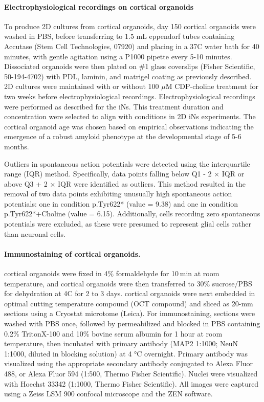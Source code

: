 \paragraph{Electrophysiological recordings on cortical organoids}
To produce 2D cultures from cortical organoids, day 150 cortical organoids were washed in PBS, before transferring to 1.5 mL eppendorf tubes containing Accutase (Stem Cell Technologies, 07920) and placing in a 37C water bath for 40 minutes, with gentle agitation using a P1000 pipette every 5-10 minutes. Dissociated organoids were then plated on \#1 glass coverslips (Fisher Scientific, 50-194-4702) with PDL, laminin, and matrigel coating as previously described. 2D cultures were maintained with or without 100 $\mu$M CDP-choline treatment for two weeks before electrophysiological recordings. Electrophysiological recordings were performed as described for the iNs. This treatment duration and concentration were selected to align with conditions in 2D iNs experiments. The cortical organoid age was chosen based on empirical observations indicating the emergence of a robust amyloid phenotype at the developmental stage of 5-6 months.

Outliers in spontaneous action potentials were detected using the interquartile range (IQR) method. Specifically, data points falling below Q1 - 2 × IQR or above Q3 + 2 × IQR were identified as outliers. This method resulted in the removal of two data points exhibiting unusually high spontaneous action potentials: one in condition p.Tyr622* (value = 9.38) and one in condition p.Tyr622*+Choline (value = 6.15). Additionally, cells recording zero spontaneous potentials were excluded, as these were presumed to represent glial cells rather than neuronal cells.

\paragraph{Immunostaining of cortical organoids.}
cortical organoids were fixed in 4\% formaldehyde for 10 min at room temperature, and cortical organoids were then transferred to 30\% sucrose/PBS for dehydration at 4C for 2 to 3 days. cortical organoids were next embedded in optimal cutting temperature compound (OCT compound) and sliced as 20-mm sections using a Cryostat microtome (Leica). For immunostaining, sections were washed with PBS once, followed by permeabilized and blocked in PBS containing 0.2\% TritonX-100 and 10\% bovine serum albumin for 1 hour at room temperature, then incubated with primary antibody (MAP2 1:1000; NeuN 1:1000, diluted in blocking solution) at 4 °C overnight. Primary antibody was visualized using the appropriate secondary antibody conjugated to Alexa Fluor 488, or Alexa Fluor 594 (1:500, Thermo Fisher Scientific). Nuclei were visualized with Hoechst 33342 (1:1000, Thermo Fisher Scientific). All images were captured using a Zeiss LSM 900 confocal microscope and the ZEN software. 